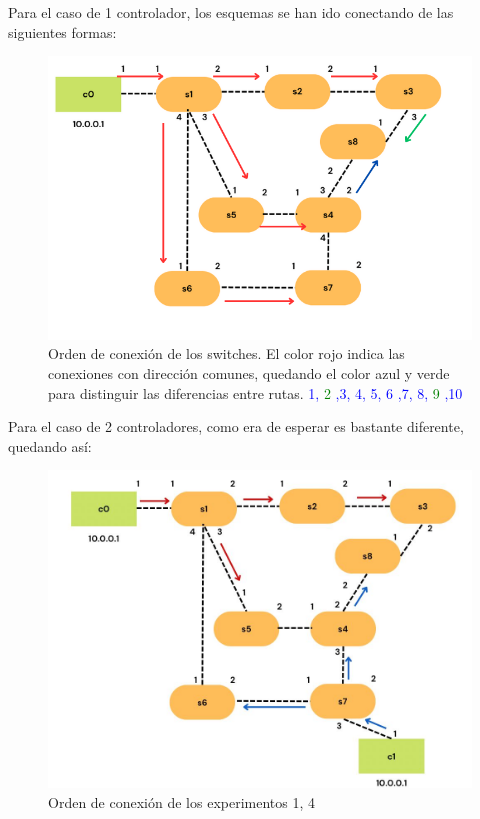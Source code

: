 \documentclass[a4paper, 12pt]{book}
\begin{document}
 	Para el caso de 1 controlador, los esquemas se han ido conectando de las siguientes formas:
 	
 	\begin{figure}[H]
 		\centering
 		\includegraphics[width=16cm, keepaspectratio]{img/rutasEscenario1-1c}
 		\caption{Orden de conexión de los switches. El color rojo indica las conexiones con dirección comunes, quedando el color azul y verde para distinguir las diferencias entre rutas. \textcolor{blue}{1,}  \textcolor{green}{2}  \textcolor{blue}{,3, 4, 5, 6 ,7, 8,}  \textcolor{green}{9} \textcolor{blue}{,10}}
 		\label{figura:escenario1_1c_1}
 	\end{figure}
 	
 	Para el caso de 2 controladores, como era de esperar es bastante diferente, quedando así:
 	
 	\begin{figure}[H]
 		\centering
 		\includegraphics[width=16cm, keepaspectratio]{img/escenario1_2c_1}
 		\caption{Orden de conexión de los experimentos 1, 4}
 		\label{figura:escenario1_2c_1}
 	\end{figure}
 	
\end{document}
